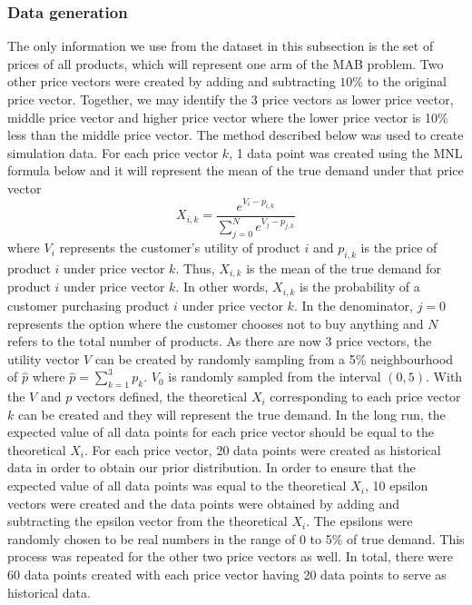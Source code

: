 \documentclass[a4paper]{article}
\begin{document}
\subsubsection{Data generation}
The only information we use from the dataset in this subsection is the set of prices of all products, which will represent one arm of the MAB problem. Two other price vectors were created by adding and subtracting $10\%$ to the original price vector. Together, we may identify the 3 price vectors as lower price vector, middle price vector and higher price vector where the lower price vector is 10\% less than the middle price vector. The method described below was used to create simulation data.
\newline
\newline
For each price vector $k$, 1 data point was created using the MNL formula below and it will represent the mean of the true demand under that price vector
\[X_{i,k} = \frac{e^{V_i - p_{i,k}}}{\sum_{j=0}^{N}e^{V_j - p_{j,k}}} \]
where $V_i$ represents the customer's utility of product $i$ and $p_{i,k}$ is the price of product $i$ under price vector $k$. Thus, $X_{i,k}$ is the mean of the true demand for product $i$ under price vector $k$.  In other words, $X_{i,k}$ is the probability of a customer purchasing product $i$ under price vector $k$. In the denominator, $j=0$ represents the option where the customer chooses not to buy anything and $N$ refers to the total number of products.
\newline
\newline
As there are now 3 price vectors, the utility vector $V$ can be created by randomly sampling from a 5\% neighbourhood of $\hat{p}$ where $\hat{p}=\sum_{k=1}^{3}p_k$. $V_0$ is randomly sampled from the interval $(0,5).$
\newline
\newline
With the $V$ and $p$ vectors defined, the theoretical $X_i$ corresponding to each price vector $k$ can be created and they will represent the true demand. In the long run, the expected value of all data points for each price vector should be equal to the theoretical $X_i$.
\newline
\newline
For each price vector, 20 data points were created as historical data in order to obtain our prior distribution. In order to ensure that the expected value of all data points was equal to the theoretical $X_i$, 10 epsilon vectors were created and the data points were obtained by adding and subtracting the epsilon vector from the theoretical $X_i$. The epsilons were randomly chosen to be real numbers in the range of 0 to 5\% of true demand. This process was repeated for the other two price vectors as well. In total, there were 60 data points created with each price vector having 20 data points to serve as historical data.
\end{document}
